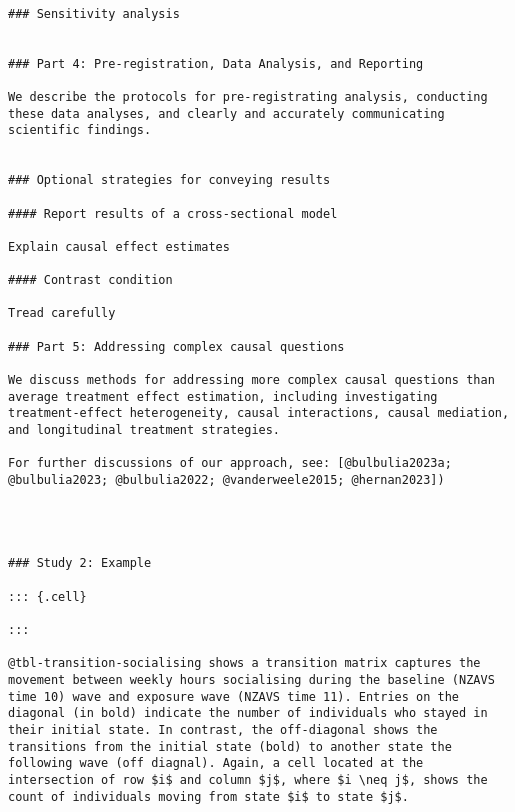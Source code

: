 \documentclass[
  singlecolumn]{article}
\begin{document}
\begin{verbatim}

### Sensitivity analysis


### Part 4: Pre-registration, Data Analysis, and Reporting

We describe the protocols for pre-registrating analysis, conducting these data analyses, and clearly and accurately communicating scientific findings. 


### Optional strategies for conveying results

#### Report results of a cross-sectional model

Explain causal effect estimates

#### Contrast condition

Tread carefully

### Part 5: Addressing complex causal questions  

We discuss methods for addressing more complex causal questions than average treatment effect estimation, including investigating treatment-effect heterogeneity, causal interactions, causal mediation, and longitudinal treatment strategies. 

For further discussions of our approach, see: [@bulbulia2023a; @bulbulia2023; @bulbulia2022; @vanderweele2015; @hernan2023])




### Study 2: Example 

::: {.cell}

:::

@tbl-transition-socialising shows a transition matrix captures the movement between weekly hours socialising during the baseline (NZAVS time 10) wave and exposure wave (NZAVS time 11). Entries on the diagonal (in bold) indicate the number of individuals who stayed in their initial state. In contrast, the off-diagonal shows the transitions from the initial state (bold) to another state the following wave (off diagnal). Again, a cell located at the intersection of row $i$ and column $j$, where $i \neq j$, shows the count of individuals moving from state $i$ to state $j$.


\end{verbatim}
\end{document}
